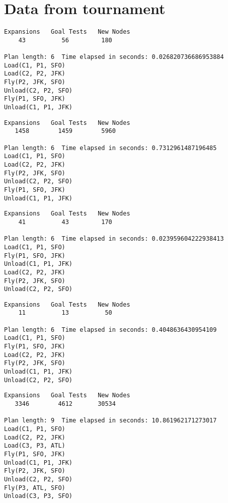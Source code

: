 \documentclass[11pt,a4paper]{report}
\begin{document}
\section*{Data from tournament}
\begin{verbatim}
Expansions   Goal Tests   New Nodes
    43          56         180

Plan length: 6  Time elapsed in seconds: 0.026820736686953884
Load(C1, P1, SFO)
Load(C2, P2, JFK)
Fly(P2, JFK, SFO)
Unload(C2, P2, SFO)
Fly(P1, SFO, JFK)
Unload(C1, P1, JFK)
\end{verbatim}
\begin{verbatim}
Expansions   Goal Tests   New Nodes
   1458        1459        5960

Plan length: 6  Time elapsed in seconds: 0.7312961487196485
Load(C1, P1, SFO)
Load(C2, P2, JFK)
Fly(P2, JFK, SFO)
Unload(C2, P2, SFO)
Fly(P1, SFO, JFK)
Unload(C1, P1, JFK)
\end{verbatim}
\begin{verbatim}
Expansions   Goal Tests   New Nodes
    41          43         170

Plan length: 6  Time elapsed in seconds: 0.023959604222938413
Load(C1, P1, SFO)
Fly(P1, SFO, JFK)
Unload(C1, P1, JFK)
Load(C2, P2, JFK)
Fly(P2, JFK, SFO)
Unload(C2, P2, SFO)
\end{verbatim}
\begin{verbatim}
Expansions   Goal Tests   New Nodes
    11          13          50

Plan length: 6  Time elapsed in seconds: 0.4048636430954109
Load(C1, P1, SFO)
Fly(P1, SFO, JFK)
Load(C2, P2, JFK)
Fly(P2, JFK, SFO)
Unload(C1, P1, JFK)
Unload(C2, P2, SFO)
\end{verbatim}
\begin{verbatim}
Expansions   Goal Tests   New Nodes
   3346        4612       30534

Plan length: 9  Time elapsed in seconds: 10.861962171273017
Load(C1, P1, SFO)
Load(C2, P2, JFK)
Load(C3, P3, ATL)
Fly(P1, SFO, JFK)
Unload(C1, P1, JFK)
Fly(P2, JFK, SFO)
Unload(C2, P2, SFO)
Fly(P3, ATL, SFO)
Unload(C3, P3, SFO)
\end{verbatim}
\end{document}
